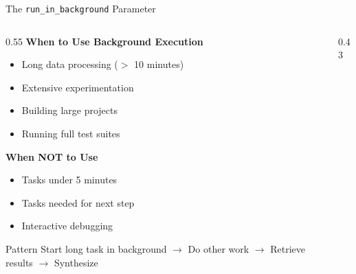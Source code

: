 \documentclass[aspectratio=169,11pt]{beamer}
\begin{document}
\begin{frame}{The \texttt{run\_in\_background} Parameter}
    \begin{columns}[T]
        \begin{column}{0.55\textwidth}
            \textbf{When to Use Background Execution}
            \begin{itemize}
                \item Long data processing ($>$ 10 minutes)
                \item Extensive experimentation
                \item Building large projects
                \item Running full test suites
            \end{itemize}

            \vspace{0.2cm}
            \textbf{When NOT to Use}
            \begin{itemize}
                \item Tasks under 5 minutes
                \item Tasks needed for next step
                \item Interactive debugging
            \end{itemize}

            \vspace{0.2cm}
            \begin{block}{Pattern}
                \footnotesize
                Start long task in background $\rightarrow$ Do other work $\rightarrow$ Retrieve results $\rightarrow$ Synthesize
            \end{block}
        \end{column}
        \begin{column}{0.43\textwidth}
\end{column}
\end{columns}
\end{frame}
\end{document}
